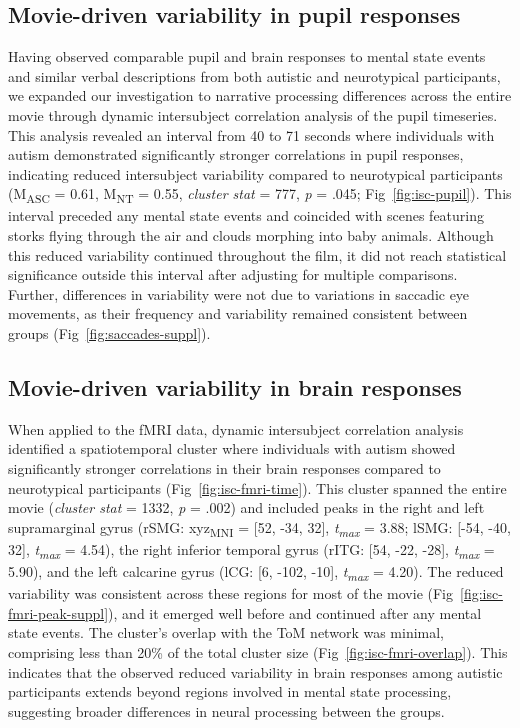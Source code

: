 \subsection*{Movie-driven variability in pupil responses }
Having observed comparable pupil and brain responses to mental state events and similar verbal descriptions from both autistic and neurotypical participants, we expanded our investigation to narrative processing differences across the entire movie through dynamic intersubject correlation analysis of the pupil timeseries. This analysis revealed an interval from 40 to 71 seconds where individuals with autism demonstrated significantly stronger correlations in pupil responses, indicating reduced intersubject variability compared to neurotypical participants (M\textsubscript{ASC} = 0.61, M\textsubscript{NT} = 0.55, \textit{cluster stat} = 777, \textit{p} = .045; Fig~\ref{fig:isc-pupil}). This interval preceded any mental state events and coincided with scenes featuring storks flying through the air and clouds morphing into baby animals. Although this reduced variability continued throughout the film, it did not reach statistical significance outside this interval after adjusting for multiple comparisons. Further, differences in variability were not due to variations in saccadic eye movements, as their frequency and variability remained consistent between groups (Fig~\ref{fig:saccades-suppl}).



\subsection*{Movie-driven variability in brain responses}
When applied to the fMRI data, dynamic intersubject correlation analysis identified a spatiotemporal cluster where individuals with autism showed significantly stronger correlations in their brain responses compared to neurotypical participants (Fig~\ref{fig:isc-fmri-time}). This cluster spanned the entire movie (\textit{cluster stat} = 1332, \textit{p} = .002) and included peaks in the right and left supramarginal gyrus (rSMG: xyz\textsubscript{MNI} = [52, -34, 32], \textit{t\textsubscript{max}} = 3.88; lSMG: [-54, -40, 32], \textit{t\textsubscript{max}} = 4.54), the right inferior temporal gyrus (rITG: [54, -22, -28], \textit{t\textsubscript{max}} = 5.90), and the left calcarine gyrus (lCG: [6, -102, -10], \textit{t\textsubscript{max}} = 4.20). The reduced variability was consistent across these regions for most of the movie (Fig~\ref{fig:isc-fmri-peak-suppl}), and it emerged well before and continued after any mental state events. The cluster's overlap with the ToM network was minimal, comprising less than 20\% of the total cluster size (Fig~\ref{fig:isc-fmri-overlap}). This indicates that the observed reduced variability in brain responses among autistic participants extends beyond regions involved in mental state processing, suggesting broader differences in neural processing between the groups.

